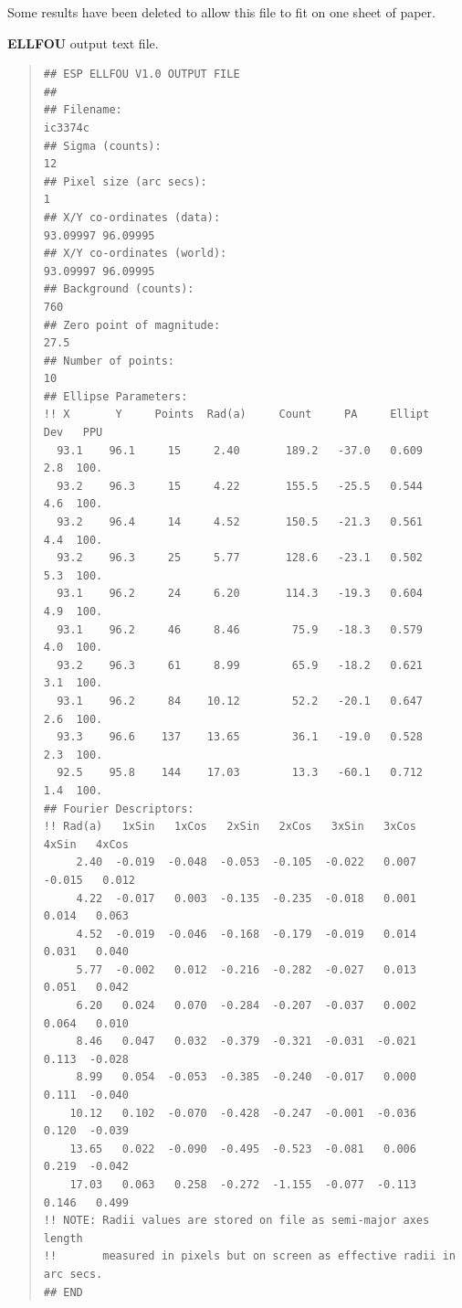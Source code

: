 \documentclass[twoside,11pt]{article}
\newenvironment{myquote}{\begin{quote}\begin{small}}{\end{small}\end{quote}}
\begin{document}
Some results have been deleted to allow this file to fit on
one sheet of paper.

\newpage
\textbf{ELLFOU} output text file.

\begin{myquote}
\begin{verbatim}
## ESP ELLFOU V1.0 OUTPUT FILE
##
## Filename: 
ic3374c                                                   
## Sigma (counts): 
12
## Pixel size (arc secs): 
1
## X/Y co-ordinates (data):
93.09997 96.09995
## X/Y co-ordinates (world):
93.09997 96.09995
## Background (counts): 
760
## Zero point of magnitude:
27.5
## Number of points:
10
## Ellipse Parameters:
!! X       Y     Points  Rad(a)     Count     PA     Ellipt     Dev   PPU       
  93.1    96.1     15     2.40       189.2   -37.0   0.609       2.8  100.      
  93.2    96.3     15     4.22       155.5   -25.5   0.544       4.6  100.      
  93.2    96.4     14     4.52       150.5   -21.3   0.561       4.4  100.      
  93.2    96.3     25     5.77       128.6   -23.1   0.502       5.3  100.      
  93.1    96.2     24     6.20       114.3   -19.3   0.604       4.9  100.      
  93.1    96.2     46     8.46        75.9   -18.3   0.579       4.0  100.      
  93.2    96.3     61     8.99        65.9   -18.2   0.621       3.1  100.      
  93.1    96.2     84    10.12        52.2   -20.1   0.647       2.6  100.      
  93.3    96.6    137    13.65        36.1   -19.0   0.528       2.3  100.      
  92.5    95.8    144    17.03        13.3   -60.1   0.712       1.4  100.      
## Fourier Descriptors:
!! Rad(a)   1xSin   1xCos   2xSin   2xCos   3xSin   3xCos   4xSin   4xCos       
     2.40  -0.019  -0.048  -0.053  -0.105  -0.022   0.007  -0.015   0.012       
     4.22  -0.017   0.003  -0.135  -0.235  -0.018   0.001   0.014   0.063       
     4.52  -0.019  -0.046  -0.168  -0.179  -0.019   0.014   0.031   0.040       
     5.77  -0.002   0.012  -0.216  -0.282  -0.027   0.013   0.051   0.042       
     6.20   0.024   0.070  -0.284  -0.207  -0.037   0.002   0.064   0.010       
     8.46   0.047   0.032  -0.379  -0.321  -0.031  -0.021   0.113  -0.028       
     8.99   0.054  -0.053  -0.385  -0.240  -0.017   0.000   0.111  -0.040       
    10.12   0.102  -0.070  -0.428  -0.247  -0.001  -0.036   0.120  -0.039       
    13.65   0.022  -0.090  -0.495  -0.523  -0.081   0.006   0.219  -0.042       
    17.03   0.063   0.258  -0.272  -1.155  -0.077  -0.113   0.146   0.499       
!! NOTE: Radii values are stored on file as semi-major axes length              
!!       measured in pixels but on screen as effective radii in arc secs.       
## END                                                                          
\end{verbatim}
\end{myquote}
\end{document}

